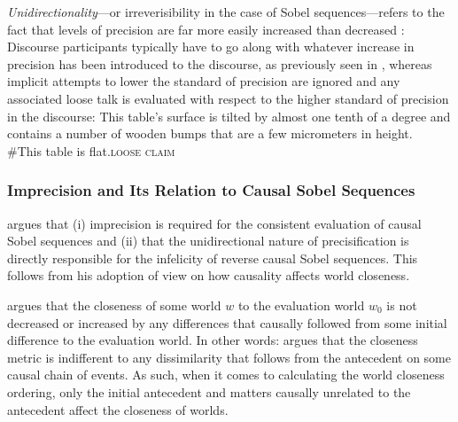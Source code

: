 \textit{Unidirectionality}---or irreverisibility in the case of Sobel sequences---refers to the fact that levels of precision are far more easily increased than decreased \parencite{Lewis1979}: Discourse participants typically have to go along with whatever increase in precision has been introduced to the discourse, as previously seen in , whereas implicit attempts to lower the standard of precision are ignored and any associated loose talk is evaluated with respect to the higher standard of precision in the discourse:
\pex{}
\a{}This table's surface is tilted by almost one tenth of a degree and contains a number of wooden bumps that are a few micrometers in height.\\
\a{}\#This table is flat.\hfill{\scshape loose claim}
\xe

\subsubsection{Imprecision and Its Relation to Causal Sobel Sequences}
\textcite{Klecha2014} argues that (i) imprecision is required for the consistent evaluation of causal Sobel sequences and (ii) that the unidirectional nature of precisification is directly responsible for the infelicity of reverse causal Sobel sequences. This follows from his adoption of  view on how causality affects world closeness.

\textcite{Bennett2003} argues that the closeness of some world $w$ to the evaluation world $w_0$ is not decreased or increased by any differences that causally followed from some initial difference to the evaluation world. In other words: \textcite{Bennett2003} argues that the closeness metric is indifferent to any dissimilarity that follows from the antecedent on some causal chain of events. As such, when it comes to calculating the world closeness ordering, only the initial antecedent and matters causally unrelated to the antecedent affect the closeness of worlds. 

